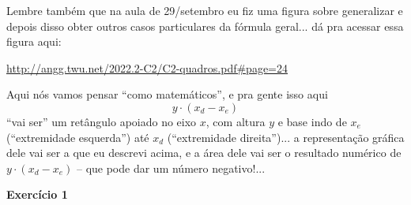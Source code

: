 \documentclass[oneside,12pt]{article}
\begin{document}
{{Lembre também que na aula de 29/setembro eu fiz uma figura sobre
generalizar e depois disso obter outros casos particulares da fórmula
geral... dá pra acessar essa figura aqui:

\ssk

{\footnotesize

\url{http://angg.twu.net/2022.2-C2/C2-quadros.pdf\#page=24}

}

Aqui nós vamos pensar ``como matemáticos'', e pra gente isso aqui
%
$$y·(x_d-x_e)$$
%
``vai ser'' um retângulo apoiado no eixo $x$, com altura $y$ e base
indo de $x_e$ (``extremidade esquerda'') até $x_d$ (``extremidade
direita'')... a representação gráfica dele vai ser a que eu descrevi
acima, e a área dele vai ser o resultado numérico de $y·(x_d-x_e)$ --
que pode dar um número negativo!...

}}



\newpage


{\bf Exercício 1}

\end{document}

